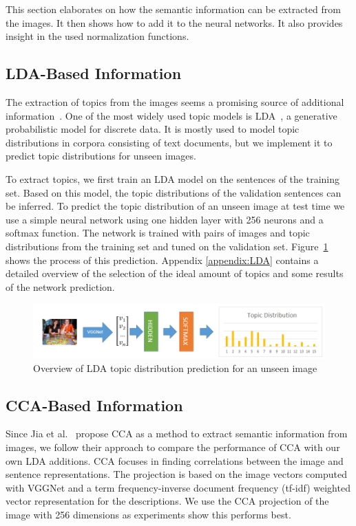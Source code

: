 \documentclass[twoside,twocolumn]{article}
\begin{document}
	This section elaborates on how the semantic information can be extracted from the images. It then shows how to add it to the neural networks. It also provides insight in the used normalization functions. 
	
	
	
	\subsection{LDA-Based Information}
	\label{sec:LDAinfo}
	The extraction of topics from the images seems a promising source of additional information~\cite{Jin2015}. One of the most widely used topic models is LDA~\cite{Blei2012}, a generative probabilistic model for discrete data. It is mostly used to model topic distributions in corpora consisting of text documents, but we implement it to predict topic distributions for unseen images.
	
	To extract topics, we first train an LDA model on the sentences of the training set. Based on this model, the topic distributions of the validation sentences can be inferred. To predict the topic distribution of an unseen image at test time we use a simple neural network using one hidden layer with 256 neurons and a softmax function. The network is trained with pairs of images and topic distributions from the training set and tuned on the validation set. Figure~\ref{fig:ldaprocess} shows the process of this prediction. Appendix \ref{appendix:LDA} contains a detailed overview of the selection of the ideal amount of topics and some results of the network prediction. 
	
	\begin{figure}
		\centering
		\includegraphics[width=\textwidth]{LDANetwerktranslate.png}
		\caption{Overview of LDA topic distribution prediction for an unseen image}
		\label{fig:ldaprocess}
	\end{figure}
	
	\subsection{CCA-Based Information}
	Since Jia et al.~\cite{Fernando2015} propose CCA as a method to extract semantic information from images, we follow their approach to compare the performance of CCA with our own LDA additions. CCA focuses in finding correlations between the image and sentence representations. The projection is based on the image vectors computed with VGGNet and a term frequency-inverse document frequency (tf-idf) weighted vector representation for the descriptions. We use the CCA projection of the image with 256 dimensions as experiments show this performs best. 
	
\end{document}
